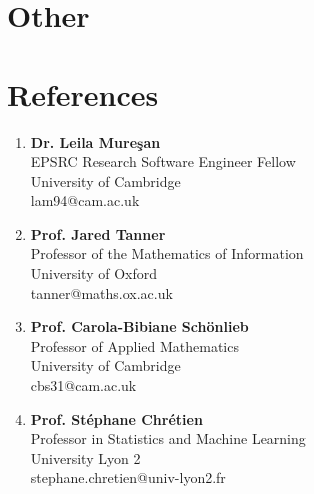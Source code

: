 \documentclass[10pt,a4paper,roman]{moderncv} %
\begin{document}
%
%
\section{Other}



\newpage

\section{References}

\vspace{1em}

\begin{enumerate}

  \item
\textbf{Dr. Leila Mureşan} \\
EPSRC Research Software Engineer Fellow \\
University of Cambridge \\
lam94@cam.ac.uk
\vspace{1em}

  \item
\textbf{Prof. Jared Tanner} \\
Professor of the Mathematics of Information \\
University of Oxford\\
tanner@maths.ox.ac.uk
\vspace{1em}

  \item
\textbf{Prof. Carola-Bibiane Schönlieb} \\
Professor of Applied Mathematics\\
University of Cambridge\\
cbs31@cam.ac.uk
\vspace{1em}


  \item
\textbf{Prof. Stéphane Chrétien} \\
Professor in Statistics and Machine Learning \\
University Lyon 2\\
stephane.chretien@univ-lyon2.fr

\end{enumerate}
\end{document}
